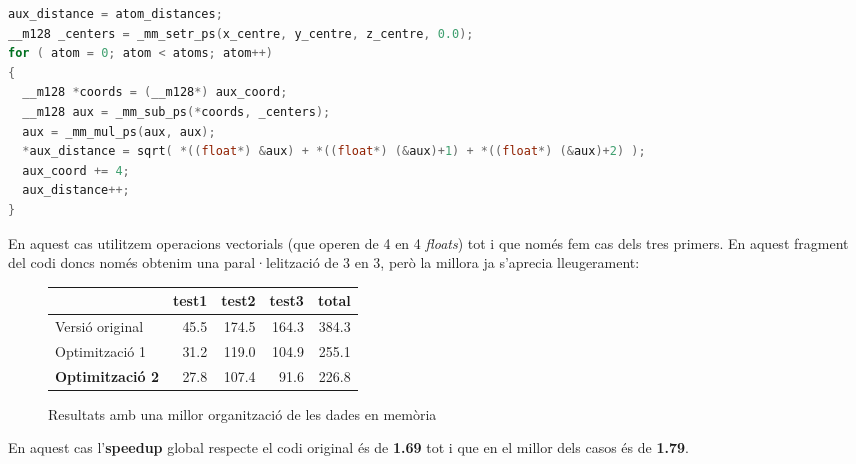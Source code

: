 \begin{lstlisting}[label=vect1, caption=Primer dels dos bucles interns aplicant vectorització, language=C]
aux_distance = atom_distances;
__m128 _centers = _mm_setr_ps(x_centre, y_centre, z_centre, 0.0);
for ( atom = 0; atom < atoms; atom++)
{
  __m128 *coords = (__m128*) aux_coord;
  __m128 aux = _mm_sub_ps(*coords, _centers);
  aux = _mm_mul_ps(aux, aux);
  *aux_distance = sqrt( *((float*) &aux) + *((float*) (&aux)+1) + *((float*) (&aux)+2) );
  aux_coord += 4;
  aux_distance++;
}
\end{lstlisting}

En aquest cas utilitzem operacions vectorials (que operen de 4 en 4 \emph{floats}) tot i que només fem cas dels tres primers. En aquest fragment del codi doncs només obtenim una paral·lelització de 3 en 3, però la millora ja s'aprecia lleugerament:

\begin{figure}[ht]
  \caption{Resultats amb una millor organització de les dades en memòria}\label{fig:elapsed_2}
  \begin{center}
    \begin{tabular}{ l r r r r }
      & test1 & test2 & test3 & total \\
      \hline
      Versió original & 45.5 & 174.5 & 164.3 & 384.3 \\
      Optimització 1 & 31.2 & 119.0 & 104.9 & 255.1 \\
      \textbf{Optimització 2} & 27.8 & 107.4 & 91.6 & 226.8 \\
    \end{tabular}
  \end{center}
\end{figure}

En aquest cas l'\textbf{speedup} global respecte el codi original és de \textbf{1.69} tot i que en el millor dels casos és de \textbf{1.79}.


